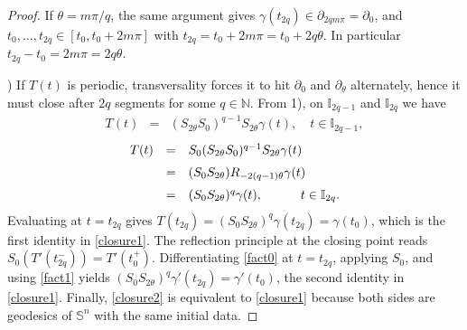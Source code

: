 \documentclass[11pt,a4paper,times]{amsart}
\theoremstyle{plain}
\theoremstyle{definition}
\numberwithin{equation}{section}
\newcommand{\eqskip}{ \vspace*{2mm}\\ }
\newcommand{\N}{\mathbb{N}}
\newcommand{\Se}{\mathbb{S}}
\newcommand{\txtg}{\textcolor{green}}
\begin{document}
\begin{proof}
If $\theta=m\pi/q$, the same argument gives $\gamma(t_{2q})\in\partial_{2qm\pi}=\partial_0$, and
$t_0,\ldots,t_{2q}\in[t_0,t_0+2m\pi]$ with $t_{2q}=t_0+2m\pi=t_0+2q\theta$. In particular
$t_{2q}-t_0=2m\pi=2q\theta$.

) If $T(t)$ is periodic, transversality forces it to hit $\partial_0$ and $\partial_\theta$ alternately,
hence it must close after $2q$ segments for some $q\in\N$. From 1), on $\mathbb{I}_{2q-1}$ and
$\mathbb{I}_{2q}$ we have
\begin{equation}
\begin{array}{rcl}\label{fact0}
 T(t) &=& (S_{2\theta}S_0)^{q-1}S_{2\theta}\gamma(t),\quad  t\in \mathbb{I}_{2q-1},
\end{array}
\end{equation}
\begin{equation}
\begin{array}{rcl}\label{fact1}
T(t) & = & S_0(S_{2\theta}S_0)^{q-1}S_{2\theta}\gamma(t)\eqskip
     & = & (S_0S_{2\theta})R_{-2(q-1)\theta}\gamma(t)\nonumber\eqskip
     & = & (S_0S_{2\theta})^q\gamma(t),\qquad \quad t\in \mathbb{I}_{2q}.\nonumber
\end{array}
\end{equation}
Evaluating at $t=t_{2q}$ gives $T(t_{2q})=(S_0S_{2\theta})^q\gamma(t_{2q})=\gamma(t_0)$, which is
the first identity in \eqref{closure1}. The reflection principle at the closing point reads
$S_0(T'(t_{2q}^-))=T'(t_0^+)$. Differentiating \eqref{fact0} at $t=t_{2q}$, applying $S_0$, and
using \eqref{fact1} yields $(S_0S_{2\theta})^q\gamma'(t_{2q})=\gamma'(t_0)$, the second identity in
\eqref{closure1}. Finally, \eqref{closure2} is equivalent to \eqref{closure1} because both sides are
geodesics of $\Se^n$ with the same initial data.
\end{proof}

\end{document}
